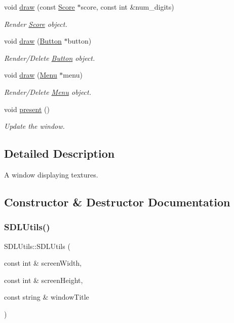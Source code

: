 \begin{DoxyCompactItemize}
void \mbox{\hyperlink{class_s_d_l_utils_a7a7ae5762a5e1b178d9ffa94645cfcdc}{draw}} (const \mbox{\hyperlink{class_score}{Score}} $\ast$score, const int \&num\+\_\+digits)
\begin{DoxyCompactList}\small\item\em Render \mbox{\hyperlink{class_score}{Score}} object. \end{DoxyCompactList}\item 
void \mbox{\hyperlink{class_s_d_l_utils_a2a500a3fe7aa85ddc32ec86afdd8edb2}{draw}} (\mbox{\hyperlink{class_button}{Button}} $\ast$button)
\begin{DoxyCompactList}\small\item\em Render/\+Delete \mbox{\hyperlink{class_button}{Button}} object. \end{DoxyCompactList}\item 
void \mbox{\hyperlink{class_s_d_l_utils_aab6c9aceff31b61a79b4dd7fc13f7473}{draw}} (\mbox{\hyperlink{class_menu}{Menu}} $\ast$menu)
\begin{DoxyCompactList}\small\item\em Render/\+Delete \mbox{\hyperlink{class_menu}{Menu}} object. \end{DoxyCompactList}\item 
void \mbox{\hyperlink{class_s_d_l_utils_a0e9c4b007ae61772a1c41592877b30ab}{present}} ()
\begin{DoxyCompactList}\small\item\em Update the window. \end{DoxyCompactList}\end{DoxyCompactItemize}


\subsection{Detailed Description}
A window displaying textures. 

\subsection{Constructor \& Destructor Documentation}
\mbox{\label{class_s_d_l_utils_ae5a15651612c48ffc4965fb3173b322d}} 
\subsubsection{\texorpdfstring{S\+D\+L\+Utils()}{SDLUtils()}}
{\footnotesize\ttfamily S\+D\+L\+Utils\+::\+S\+D\+L\+Utils (\begin{DoxyParamCaption}\item[{const int \&}]{screen\+Width,  }\item[{const int \&}]{screen\+Height,  }\item[{const string \&}]{window\+Title }\end{DoxyParamCaption})\hspace{0.3cm}{\ttfamily [inline]}}



